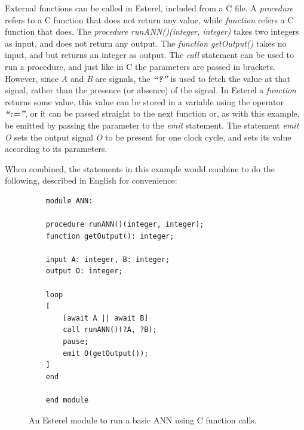 External functions can be called in Esterel, included from a C file.
A \textit{procedure} refers to a C function that does not return any value, while \textit{function} refers a C function that does.
The \textit{procedure runANN()(integer, integer)} takes two integers as input, and does not return any output.
The \textit{function getOutput()} takes no input, and but returns an integer as output.
The \textit{call} statement can be used to run a procedure, and just like in C the parameters are passed in brackets.
However, since \textit{A} and \textit{B} are signals, the \textbf{\emph{``?''}} is used to fetch the value at that signal, rather than the presence (or absence) of the signal.
In Esterel a \textit{function} returns some value, this value can be stored in a variable using the operator \textbf{\emph{``:=''}}, or it can be passed straight to the next function or, as with this example, be emitted by passing the parameter to the \textit{emit} statement.
The statement \textit{emit O} sets the output signal \textit{O} to be present for one clock cycle, and sets its value according to its parameters.

When combined, the statements in this example would combine to do the following, described in English for convenience:

\begin{figure}
	\begin{lstlisting}
	module ANN:
	
	procedure runANN()(integer, integer);
	function getOutput(): integer;
	
	input A: integer, B: integer;
	output O: integer;
	
	loop
	[
		[await A || await B] 
		call runANN()(?A, ?B);
		pause;
		emit O(getOutput());
	]
	end
	
	end module
	\end{lstlisting}
	\caption{An Esterel module to run a basic \ac{ANN} using C function calls.}
	\label{fig:esterel-abro}
\end{figure}


